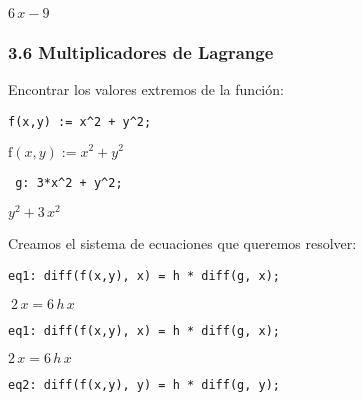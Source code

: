 \documentclass[12pt]{article}
\begin{document}
\begin{math}
6\,x-9
\end{math}


\subsubsection*{3.6 Multiplicadores de Lagrange}
Encontrar los valores extremos de la función:

\noindent

\begin{verbatim}
f(x,y) := x^2 + y^2;
\end{verbatim}


\begin{math}
\mathrm{f}\left( x,y\right) :={x}^{2}+{y}^{2}
\end{math}

\noindent

\begin{verbatim}
 g: 3*x^2 + y^2;
\end{verbatim}

\begin{math}
{y}^{2}+3\,{x}^{2}
\end{math}

Creamos el sistema de ecuaciones que queremos resolver:


\noindent


\begin{verbatim}
eq1: diff(f(x,y), x) = h * diff(g, x);
\end{verbatim}

\begin{math}\
2\,x=6\,h\,x
\end{math}



\noindent

\begin{verbatim}
eq1: diff(f(x,y), x) = h * diff(g, x);
\end{verbatim}


\begin{math}
2\,x=6\,h\,x
\end{math}


\noindent

\begin{verbatim}
eq2: diff(f(x,y), y) = h * diff(g, y);
\end{verbatim}
\end{document}
